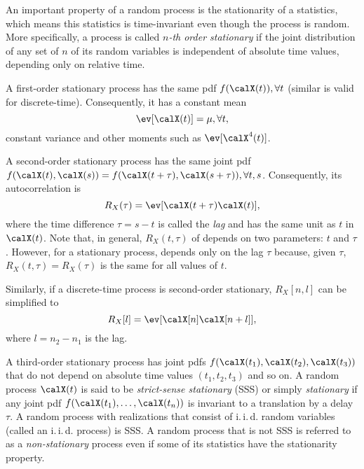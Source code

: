 An important property of a random process is the stationarity of a statistics, which means this statistics is time-invariant even though the process is random. More specifically, a process is called \emph{$n$-th order stationary} if the joint distribution of any set of $n$ of its random variables is independent of absolute time values, depending only on relative time.

A first-order stationary process has the same pdf $f(\calX(t)), \forall t$ (similar is valid for  discrete-time). Consequently,
it has a constant mean
\begin{equation}
\ev[\calX(t)] = \mu, \forall t,
\label{eq:stationaryMean}
\end{equation}
constant variance and other moments such as $\ev[\calX^4(t)]$.

A second-order stationary process has the same joint pdf $f(\calX(t),\calX(s))=f(\calX(t+\tau),\calX(s+\tau)), \forall t,s$. Consequently, its autocorrelation is
\begin{equation}
R_{X}(\tau) = \ev[\calX(t+\tau) \calX(t)],
\label{eq:continuousTimeCorrelation}
\end{equation}
where the time difference $\tau=s-t$ is called the \emph{lag} and has the same unit as $t$ in $\calX(t)$. Note that, in general, $R_X(t,\tau)$ of  depends on two parameters: $t$ and $\tau$. However,
for a stationary process,  depends only on the lag $\tau$ because, given $\tau$,
$R_X(t,\tau) = R_X(\tau)$ is the same for all values of $t$.

Similarly, if a discrete-time process is second-order stationary, $R_X[n,l]$  can be simplified to
\begin{equation}
R_X[l] = \ev[\calX[n] \calX[n+l]],
\label{eq:discreteTimeCorrelationWSS}
\end{equation}
where $l=n_2 - n_1$ is the lag.

A third-order stationary process has joint pdfs $f(\calX(t_1),\calX(t_2),\calX(t_3))$ that do not depend on absolute time values $(t_1,t_2,t_3)$ and so on.
A random process $\calX(t)$ is said to be \emph{strict-sense stationary} (SSS) or simply \emph{stationary} if any joint pdf $f(\calX(t_1),\dots,\calX(t_n))$ is invariant to a translation by a
delay $\tau$.
A random process with realizations that consist of i.\,i.\,d. random variables (called an
i.\,i.\,d. process) is SSS.
A random process that is not SSS is
referred to as a \emph{non-stationary} process even if some of its statistics have the stationarity property.

